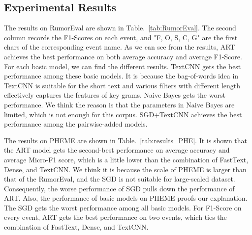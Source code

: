 \begin{table}[htbp]
	\caption{RumorEval}
	\centering
	\label{tab:RumorEval}
\end{table}


\subsection{Experimental Results}
The results on RumorEval are shown in Table.~{\ref{tab:RumorEval}}. The second column records the F1-Scores on each event, and "F, O, S, C, G" are the first chars of the corresponding event name. As we can see from the results, ART achieves the best performance on both average accuracy and average F1-Score. For each basic model, we can find the different results. TextCNN gets the best performance among these basic models. It is because the bag-of-words idea in TextCNN is suitable for the short text and various filters with different length effectively captures the features of key grams. Naive Bayes gets the worst performance. We think the reason is that the parameters in Naive Bayes are limited, which is not enough for this corpus. SGD+TextCNN achieves the best performance among the pairwise-added models. 

The results on PHEME are shown in Table.~\ref{tab:results_PHE}. It is shown that the ART model gets the second-best performance on average accuracy and average Micro-F1 score, which is a little lower than the combination of FastText, Dense, and TextCNN. We think it is because the scale of PHEME is larger than that of the RumorEval, and the SGD is not suitable for large-scaled dataset. Consequently, the worse performance of SGD pulls down the performance of ART. Also, the performance of basic models on PHEME proofs our explanation. The SGD gets the worst performance among all basic models. For F1-Score on every event, ART gets the best performance on two events, which ties the combination of FastText, Dense, and TextCNN.


